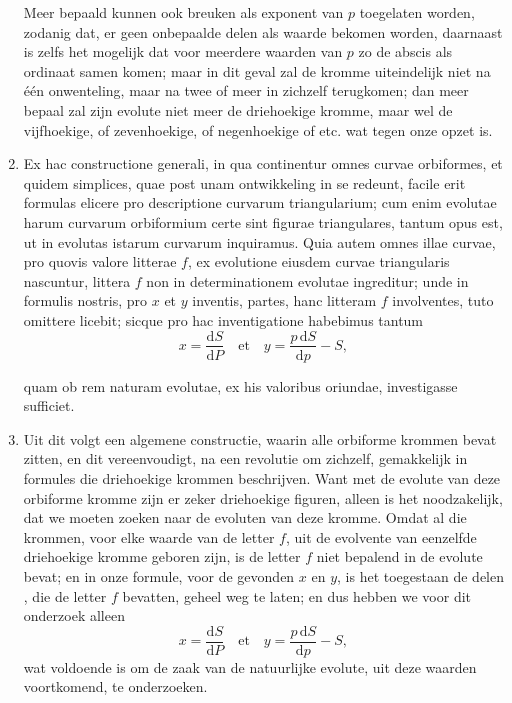 \documentclass[10pt,a4paper]{article}
\newcommand{\switchenum}{\setcounter{enumi}{\arabic{enumi}-1}\switchcolumn}
\def\D{\mathrm{d}}
\begin{document}
\begin{paracol}{2}
\begin{enumerate}[topsep=1px]
		Meer bepaald kunnen ook breuken als exponent van $p$ toegelaten worden, zodanig dat, er geen onbepaalde delen als waarde bekomen worden, daarnaast is zelfs het mogelijk dat voor meerdere waarden van $p$ zo de abscis als ordinaat samen komen; maar in dit geval zal de kromme uiteindelijk niet na één onwenteling, maar na twee of meer in zichzelf terugkomen;  dan meer bepaal zal zijn evolute niet meer de driehoekige kromme, maar wel de vijfhoekige, of zevenhoekige, of negenhoekige of etc. wat tegen onze opzet is.
		

		\switchcolumn*
		
		\item Ex hac constructione generali, in qua continentur omnes curvae orbiformes, et quidem simplices, quae post unam ontwikkeling in se redeunt, facile erit formulas elicere pro descriptione curvarum triangularium; cum enim evolutae harum curvarum orbiformium certe sint figurae triangulares, tantum opus est, ut in evolutas istarum curvarum inquiramus. Quia autem omnes illae curvae, pro quovis valore litterae $f$, ex evolutione eiusdem curvae triangularis nascuntur, littera $f$ non in determinationem evolutae ingreditur; unde in formulis nostris, pro $x$ et $y$ inventis, partes, hanc litteram $f$ involventes, tuto omittere licebit; sicque pro hac inventigatione habebimus tantum
		\[
			x = \frac{\D S}{\D P} \quad\text{et} \quad y = \frac{p\,\D S}{\D p}-S,
		\]
		\par quam ob rem naturam evolutae, ex his valoribus oriundae, investigasse sufficiet. 
		
		\switchenum
		\item Uit dit volgt een algemene constructie, waarin alle orbiforme krommen bevat zitten, en dit vereenvoudigt, na een revolutie om zichzelf, gemakkelijk in formules die driehoekige krommen beschrijven. Want met de evolute van deze orbiforme kromme zijn er zeker driehoekige figuren, alleen is het noodzakelijk, dat we moeten zoeken naar de evoluten van deze kromme. Omdat al die krommen, voor elke waarde van de letter $f$, uit de evolvente van eenzelfde driehoekige kromme geboren zijn, is de letter $f$ niet bepalend in de evolute bevat; en in onze formule, voor de gevonden $x$ en $y$, is het toegestaan de delen , die de letter $f$ bevatten, geheel weg te laten; en dus hebben we voor dit onderzoek alleen
		\[
			x = \frac{\D S}{\D P} \quad\text{et} \quad y = \frac{p\,\D S}{\D p}-S,
		\]
		wat voldoende is om de zaak van de natuurlijke evolute, uit deze waarden voortkomend, te onderzoeken.
		

\end{enumerate}
\end{paracol}
\end{document}
